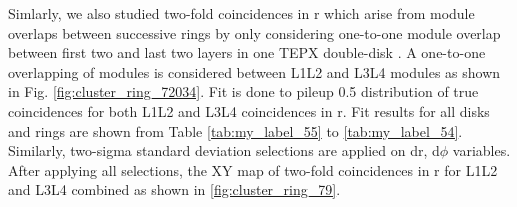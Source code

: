 
\newpage

Simlarly, we also studied two-fold coincidences in r which arise from module overlaps between successive rings by only considering one-to-one module overlap between first two and last two layers in one TEPX double-disk \cite{BRIL2021}.  %
 A one-to-one overlapping of modules is considered between L1L2 and L3L4 modules as shown in Fig. \ref{fig:cluster_ring_72034}. %
 Fit is done to pileup 0.5 distribution of true coincidences for both L1L2 and L3L4 coincidences in r. %
  Fit results for all disks and rings are shown from  Table \ref{tab:my_label_55} to \ref{tab:my_label_54}. Similarly, two-sigma standard deviation selections are applied on dr, d$\phi$ variables. After applying all selections, the XY map of two-fold coincidences in r for L1L2 and L3L4 combined as shown in \ref{fig:cluster_ring_79}.

